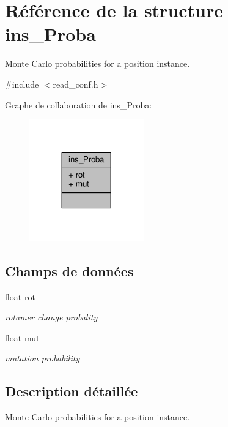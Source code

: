 \hypertarget{structins___proba}{\section{Référence de la structure ins\+\_\+\+Proba}
\label{structins___proba}
}


Monte Carlo probabilities for a position instance.  




{\ttfamily \#include $<$read\+\_\+conf.\+h$>$}



Graphe de collaboration de ins\+\_\+\+Proba\+:\nopagebreak
\begin{figure}[H]
\begin{center}
\leavevmode
\includegraphics[width=140pt]{structins___proba__coll__graph}
\end{center}
\end{figure}
\subsection*{Champs de données}
\begin{DoxyCompactItemize}
\item 
float \hyperlink{structins___proba_aea043481f2fc62dc33dc1ca86b3152dd}{rot}
\begin{DoxyCompactList}\small\item\em rotamer change probality \end{DoxyCompactList}\item 
float \hyperlink{structins___proba_af53671eed50e63606035b392b4b2bba9}{mut}
\begin{DoxyCompactList}\small\item\em mutation probability \end{DoxyCompactList}\end{DoxyCompactItemize}


\subsection{Description détaillée}
Monte Carlo probabilities for a position instance. 

